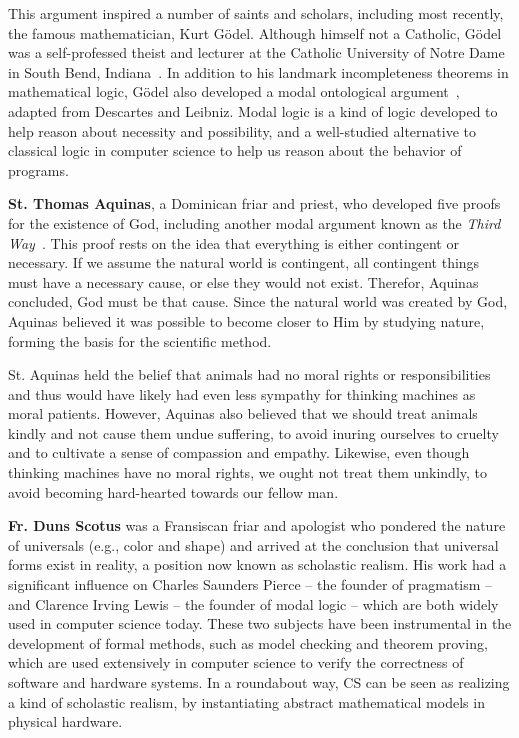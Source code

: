 \documentclass[sigplan,nonacm]{acmart}\settopmatter{printfolios=false,printccs=false,printacmref=false}
\begin{document}
  This argument inspired a number of saints and scholars, including most recently, the famous mathematician, Kurt G\"odel. Although himself not a Catholic, G\"odel was a self-professed theist and lecturer at the Catholic University of Notre Dame in South Bend, Indiana~\cite{adzic2017logiclecturesgodelsbasic}. In addition to his landmark incompleteness theorems in mathematical logic, G\"odel also developed a modal ontological argument~\cite{wang1997logical}, adapted from Descartes and Leibniz. Modal logic is a kind of logic developed to help reason about necessity and possibility, and a well-studied alternative to classical logic in computer science to help us reason about the behavior of programs.

  \textbf{St. Thomas Aquinas}, a Dominican friar and priest, who developed five proofs for the existence of God, including another modal argument known as the \textit{Third Way}~\cite{aquinas2008summa}. This proof rests on the idea that everything is either contingent or necessary. If we assume the natural world is contingent, all contingent things must have a necessary cause, or else they would not exist. Therefor, Aquinas concluded, God must be that cause. Since the natural world was created by God, Aquinas believed it was possible to become closer to Him by studying nature, forming the basis for the scientific method.

  St. Aquinas held the belief that animals had no moral rights or responsibilities and thus would have likely had even less sympathy for thinking machines as moral patients. However, Aquinas also believed that we should treat animals kindly and not cause them undue suffering, to avoid inuring ourselves to cruelty and to cultivate a sense of compassion and empathy. Likewise, even though thinking machines have no moral rights, we ought not treat them unkindly, to avoid becoming hard-hearted towards our fellow man.

  \textbf{Fr. Duns Scotus} was a Fransiscan friar and apologist who pondered the nature of universals (e.g., color and shape) and arrived at the conclusion that universal forms exist in reality, a position now known as scholastic realism. His work had a significant influence on Charles Saunders Pierce -- the founder of pragmatism -- and Clarence Irving Lewis -- the founder of modal logic -- which are both widely used in computer science today. These two subjects have been instrumental in the development of formal methods, such as model checking and theorem proving, which are used extensively in computer science to verify the correctness of software and hardware systems. In a roundabout way, CS can be seen as realizing a kind of scholastic realism, by instantiating abstract mathematical models in physical hardware.
\end{document}
